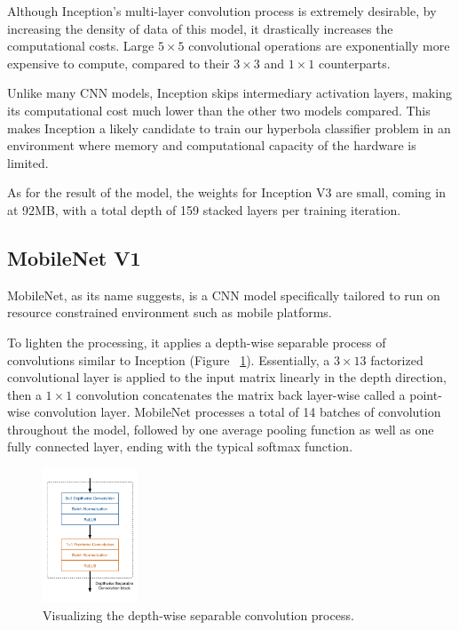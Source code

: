 \documentclass[se,blockletter]{uw-wkrpt}
\begin{document}
Although Inception's multi-layer convolution process is extremely desirable, by increasing the density of data of this model, it drastically increases the computational costs. Large $5\times 5$ convolutional operations are exponentially more expensive to compute, compared to their $3\times 3$ and $1\times 1$ counterparts.


Unlike many CNN models, Inception skips intermediary activation layers, making its computational cost much lower than the other two models compared. This makes Inception a likely candidate to train our hyperbola classifier problem in an environment where memory and computational capacity of the hardware is limited.

As for the result of the model, the weights for Inception V3 are small, coming in at 92MB, with a total depth of 159 stacked layers per training iteration. 

\subsection{MobileNet V1}
MobileNet, as its name suggests, is a CNN model specifically tailored to run on resource constrained environment such as mobile platforms. 

To lighten the processing, it applies a depth-wise separable process of convolutions similar to Inception (Figure ~\ref{fig:depthwise-separable-conv}). Essentially, a $3 \times 13$ factorized convolutional layer is applied to the input matrix linearly in the depth direction, then a $1 \times 1$ convolution concatenates the matrix back layer-wise called a point-wise convolution layer. MobileNet processes a total of 14 batches of convolution throughout the model, followed by one average pooling function as well as one fully connected layer, ending with the typical softmax function.

\begin{figure}
  \centering
  \includegraphics[height=4cm]{depthwise-separable-conv}
  \caption{Visualizing the depth-wise separable convolution process.~\cite{ref:}}
  \label{fig:depthwise-separable-conv}
\end{figure}
\end{document}
